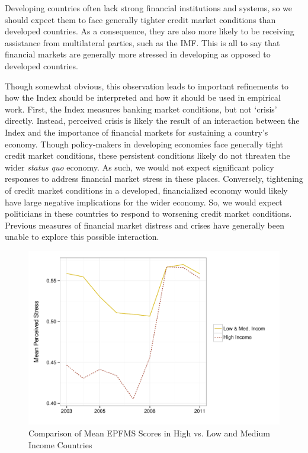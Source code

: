 \documentclass[]{article}
\begin{document}
Developing countries often lack strong financial institutions and systems, so we should expect them to face generally tighter credit market conditions than developed countries. As a consequence, they are also more likely to be receiving assistance from multilateral parties, such as the IMF. This is all to say that financial markets are generally more stressed in developing as opposed to developed countries.

Though somewhat obvious, this observation leads to important refinements to how the Index should be interpreted and how it should be used in empirical work. First, the Index measures banking market conditions, but not `crisis' directly. Instead, perceived crisis is likely the result of an interaction between the Index and the importance of financial markets for sustaining a country's economy. Though policy-makers in developing
economies face generally tight credit market conditions, these
persistent conditions likely do not threaten the wider \emph{status quo} economy. As such, we would not expect significant policy responses to address financial market stress in these places. Conversely, tightening of credit market conditions in a developed, financialized economy would
likely have large negative implications for the wider economy. So, we would expect politicians in these countries to respond to worsening credit market conditions. Previous measures of financial market distress and crises have generally been unable to explore this possible interaction.

\begin{figure}
    \caption{Comparison of Mean EPFMS Scores in High vs. Low and Medium Income Countries}
    \label{comp_dev_developing}

    \begin{center}
        \includegraphics[scale=0.45]{analysis/figures/dev_vs_devoloping.pdf}
    \end{center}
\end{figure}
\end{document}
